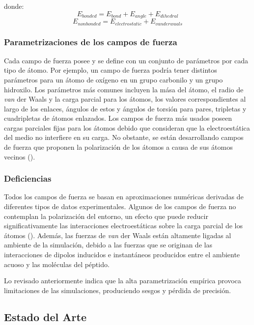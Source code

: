donde:
\begin{equation}
E_{bonded}=E_{bond}+E_{angle}+E_{dihedral}
\end{equation}
\begin{equation}
\label{eq:nonbonded}
E_{nonbonded}=E_{electrostatic}+E_{van der waals}
\end{equation}

\subsubsection{Parametrizaciones de los campos de fuerza}

Cada campo de fuerza posee y se define con un conjunto de parámetros por cada tipo de átomo. Por ejemplo, un campo de fuerza podría tener distintos parámetros para un átomo de oxígeno en un grupo carbonilo y un grupo hidroxilo. Los parámetros más comunes incluyen la mása del átomo, el radio de \textit{van} der Waals y la carga parcial para los átomos, los valores correspondientes al largo de los enlaces, ángulos de estos y ángulos de torsión para pares, tripletas y cuadripletas de átomos enlazados. Los campos de fuerza más usados poseen cargas parciales fijas para los átomos debido que consideran que la electroestática del medio no interfiere en su carga. No obstante, se están desarrollando campos de fuerza que proponen la polarización de los átomos a causa de sus átomos vecinos (\citealp{Beauchamp:2012}).

\subsubsection{Deficiencias}

Todos los campos de fuerza se basan en aproximaciones numéricas derivadas de diferentes tipos de datos experimentales. Algunos de los campos de fuerza no contemplan la polarización del entorno, un efecto que puede reducir significativamente las interacciones electroestáticas sobre la carga parcial de los átomos (\citealp{hornak:2006}). Además, las fuerzas de \textit{van} der Waals están altamente ligadas al ambiente de la simulación, debido a las fuerzas que se originan de las interacciones de dipolos inducidos e instantáneos producidos entre el ambiente acuoso y las moléculas del péptido. 

Lo revisado anteriormente indica que la alta parametrización empírica provoca limitaciones de las simulaciones, produciendo sesgos y pérdida de precisión.

\subsection{Estado del Arte}
\label{fundamentos:estado-arte}

